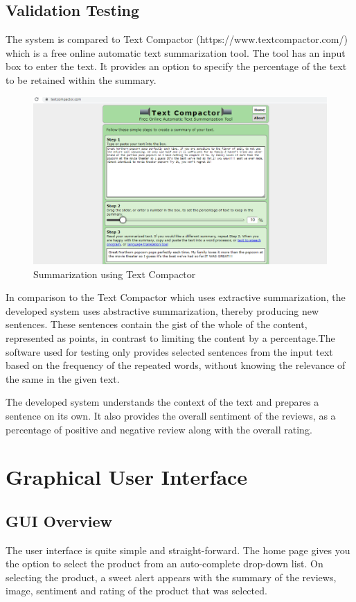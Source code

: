 \documentclass[11pt]{report}
\begin{document}
\newpage
\section{Validation Testing}
The system is compared to Text Compactor (https://www.textcompactor.com/) which is a free online automatic text summarization tool. The tool has an input box to enter the text. It provides an option to specify the percentage of the text to be retained within the summary. 
\begin{figure}[H]
    \centering
    \includegraphics[scale=0.5]{images/ValidationTesting.png}
    \caption{Summarization using Text Compactor}
    \label{fig:my_label}
\end{figure}


In comparison to the Text Compactor which uses extractive summarization, the developed system uses abstractive summarization, thereby producing new sentences. These sentences contain the gist of the whole of the content, represented as points, in contrast to limiting the content by a percentage.The software used for testing only provides selected sentences from the input text based on the frequency of the repeated words, without knowing the relevance of the same in the given text.

The developed system understands the context of the text and prepares a sentence on its own. It also provides the overall sentiment of the reviews, as a percentage of positive and negative review along with the overall rating.

\chapter{Graphical User Interface}
\section{GUI Overview}
The user interface is quite simple and straight-forward. The home page gives you the option to select the product from an auto-complete drop-down list. On selecting the product, a sweet alert appears with the summary of the reviews, image, sentiment and rating of the product that was selected.
\end{document}
